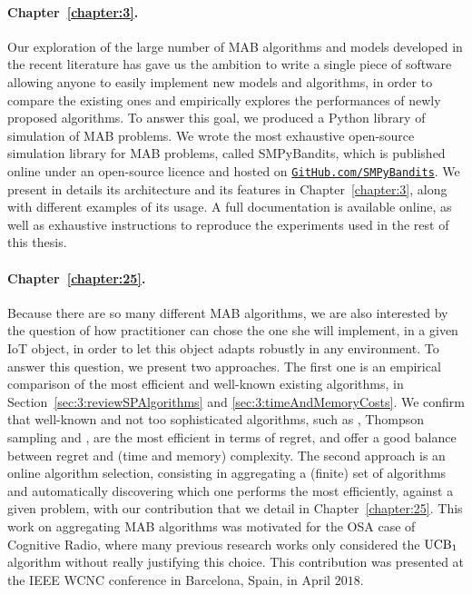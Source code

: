 \paragraph{Chapter~\ref{chapter:3}.}
%
Our exploration of the large number of MAB algorithms and models developed in the recent literature
has gave us the ambition to write a single piece of software allowing anyone to easily implement new models and algorithms, in order to compare the existing ones and empirically explores the performances of newly proposed algorithms.
To answer this goal, we produced a Python library of simulation of MAB problems.
%
We wrote the most exhaustive open-source simulation library for MAB problems, called SMPyBandits, which is published online under an open-source licence \cite{SMPyBandits,SMPyBanditsJMLR} and hosted on \href{https://GitHub.com/SMPyBandits}{\texttt{GitHub.com/SMPyBandits}}.
We present in details its architecture and its features in Chapter~\ref{chapter:3}, along with different examples of its usage.
A full documentation is available online, as well as exhaustive instructions to reproduce the experiments used in the rest of this thesis.


\paragraph{Chapter~\ref{chapter:25}.}
%
Because there are so many different MAB algorithms, we are also interested by the question of how practitioner can chose the one she will implement, in a given IoT object, in order to let this object adapts robustly in any environment.
To answer this question, we present two approaches.
The first one is an empirical comparison of the most efficient and well-known existing algorithms, in Section~\ref{sec:3:reviewSPAlgorithms} and \ref{sec:3:timeAndMemoryCosts}.
We confirm that well-known and not too sophisticated algorithms, such as \UCB{} \cite{Auer02}, Thompson sampling \cite{Thompson33} and \klUCB{} \cite{KLUCBJournal}, are the most efficient in terms of regret, and offer a good balance between regret and (time and memory) complexity.
The second approach is an online algorithm selection, consisting in aggregating a (finite) set of algorithms and automatically discovering which one performs the most efficiently, against a given problem, with our contribution \Aggr{} that we detail in Chapter~\ref{chapter:25}.
This work on aggregating MAB algorithms was motivated for the OSA case of Cognitive Radio, where many previous research works only considered the $\mathrm{UCB}_1$ algorithm without really justifying this choice.
This contribution was presented at the IEEE WCNC conference in Barcelona, Spain, in April $2018$.


